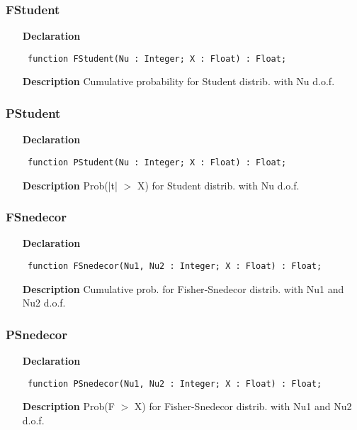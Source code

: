 \documentclass[12pt,a4paper,oneside]{report}
\newcommand{\declarationitem}[1]{\textbf{#1}}
\newcommand{\descriptiontitle}[1]{\textbf{#1}}
\newcommand{\code}[1]{\texttt{#1}}
\begin{document}
\subsubsection{FStudent}
\label{uibtdist-FStudent}
\begin{itemize}\item[\declarationitem{Declaration}\hfill]
	\begin{flushleft}
		\code{
			function FStudent(Nu : Integer; X : Float) : Float;}
	\end{flushleft}
	\item[\descriptiontitle{Description}]
	Cumulative probability for Student distrib. with Nu d.o.f.
\end{itemize}
\subsubsection{PStudent}
\label{uibtdist-PStudent}
\begin{itemize}\item[\declarationitem{Declaration}\hfill]
	\begin{flushleft}
		\code{
			function PStudent(Nu : Integer; X : Float) : Float;}
	\end{flushleft}
	\item[\descriptiontitle{Description}]
	Prob(|t| {$>$} X) for Student distrib. with Nu d.o.f.
\end{itemize}
\subsubsection{FSnedecor}
\label{uibtdist-FSnedecor}
\begin{itemize}\item[\declarationitem{Declaration}\hfill]
	\begin{flushleft}
		\code{
			function FSnedecor(Nu1, Nu2 : Integer; X : Float) : Float;}
	\end{flushleft}
	\item[\descriptiontitle{Description}]
	Cumulative prob. for Fisher{-}Snedecor distrib. with Nu1 and Nu2 d.o.f.
\end{itemize}
\subsubsection{PSnedecor}
\label{uibtdist-PSnedecor}
\begin{itemize}\item[\declarationitem{Declaration}\hfill]
	\begin{flushleft}
		\code{
			function PSnedecor(Nu1, Nu2 : Integer; X : Float) : Float;}
	\end{flushleft}
	\item[\descriptiontitle{Description}]
	Prob(F {$>$} X) for Fisher{-}Snedecor distrib. with Nu1 and Nu2 d.o.f.
\end{itemize}
\end{document}
